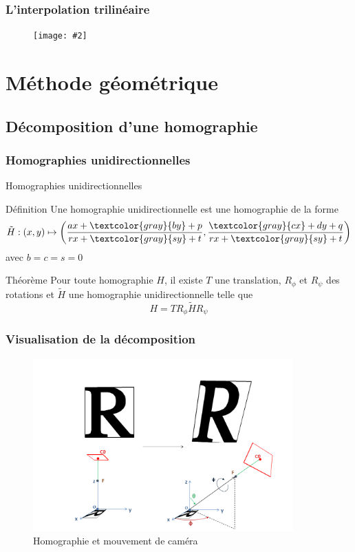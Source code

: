 \documentclass[c,12pt]{beamer}
\newcommand{\image}[2]{\begin{figure} \texttt{[image: \#2]}\end{figure}}
\newcommand{\gray}{\textcolor{gray}}
\newcommand{\fram}[2]{\begin{frame} \frametitle{#1} #2 \end{frame}}
\begin{document}
 
 \fram{L'interpolation trilinéaire}{\image{0.5}{intertri.jpg}}
 
     
     
     
    
     
     
     
     
     
     
     
     
     
     
\section{Méthode géométrique}
 
 \subsection{Décomposition d'une homographie}

  \subsubsection{Homographies unidirectionnelles}

  \begin{frame}{Homographies unidirectionnelles}
   \begin{block}{Définition}
    Une homographie unidirectionnelle est une homographie de la forme
    \[\tilde H : (x,y) \mapsto \left(\frac{ax+\gray{by}+p}{rx+\gray{sy}+t},\frac{\gray{cx}+dy+q}{rx+\gray{sy}+t}\right)\]
    avec $b=c=s=0$
   \end{block}
   \begin{block}{Théorème}
    Pour toute homographie $H$, il existe $T$ une translation, $R_\phi$ et $R_\psi$ des rotations et $\tilde H$ une homographie unidirectionnelle telle que
    \[H = T R_\phi \tilde H R_\psi\]
   \end{block}
  \end{frame}
  

  
\subsubsection{Visualisation de la décomposition}

  \begin{frame}
  \begin{figure}
   \centering
   \includegraphics[width=100mm]{beamer_decompo_all.png}
   \caption{Homographie et mouvement de caméra}
  \end{figure}
  \end{frame}
\end{document}

